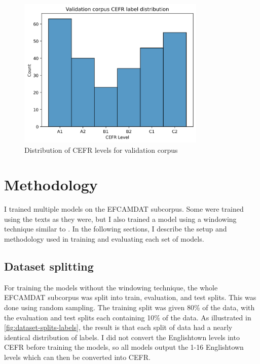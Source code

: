 \documentclass[11pt,a4paper]{article}
\begin{document}
\begin{figure}
  \centering
  \includegraphics[width=0.8\textwidth]{figures/cefr-distribution-validation.png}
  \caption{Distribution of CEFR levels for validation corpus}
  \label{fig:validation-distribution}
\end{figure}

\section{Methodology}

I trained multiple models on the EFCAMDAT subcorpus. Some were trained using the
texts as they were, but I also trained a model using a windowing technique
similar to \parencite{kerz-etal-2021-automated}. In the following sections, I
describe the setup and methodology used in training and evaluating each
set of models.

\subsection{Dataset splitting}

For training the models without the windowing technique, the whole EFCAMDAT subcorpus was split
into train, evaluation, and test splits. This was done using random sampling.
The training split was given 80\% of the data, with the evaluation and test
splits each containing 10\% of the data. As illustrated in
\autoref{fig:dataset-splits-labels}, the result is that each split of data had
a nearly identical distribution of labels. I did not convert the Englishtown
levels into CEFR before training the models, so all models output the 1-16
Englishtown levels which can then be converted into CEFR.
\end{document}
